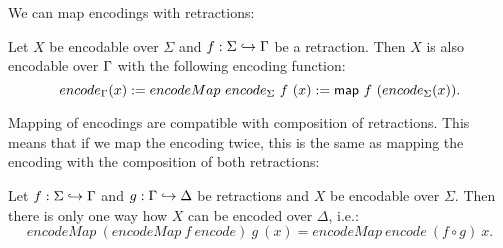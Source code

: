 We can map encodings with retractions:
\begin{definition}
  \label{def:Encode_map}
  Let $X$ be encodable over $\Sigma$ and $f : \Sigma \hookrightarrow \Gamma$ be a retraction.  Then $X$ is also encodable over $\Gamma$ with the following
  encoding function:
  \[ encode_\Gamma(x) := encodeMap~encode_\Sigma~f~(x) := \mathsf{map}~f~(encode_\Sigma(x)). \]
\end{definition}

Mapping of encodings are compatible with composition of retractions.  This means that if we map the encoding twice, this is the same as mapping the
encoding with the composition of both retractions:
\begin{lemma}
  \label{lem:Encode_map_comp}
  Let $f : \Sigma \hookrightarrow \Gamma$ and $g : \Gamma \hookrightarrow \Delta$ be retractions and $X$ be encodable over $\Sigma$.  Then there is only
  one way how $X$ can be encoded over $\Delta$, i.e.:
  \[ encodeMap~(encodeMap~f~encode)~g~(x) = encodeMap~encode~(f \circ g)~x. \]
\end{lemma}

